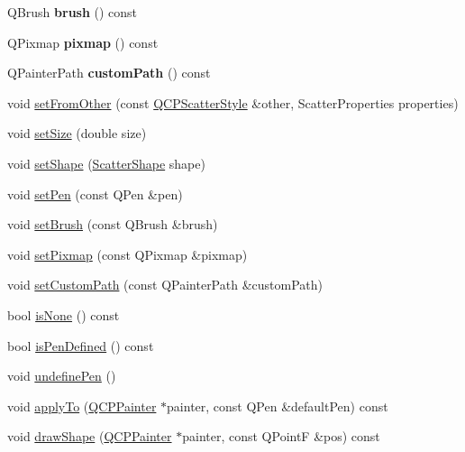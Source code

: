 \begin{DoxyCompactItemize}
Q\+Brush {\bfseries brush} () const
\item 
\mbox{\label{class_q_c_p_scatter_style_a9b2d1a2ec0aac0c74f7582d14050e93a}} 
Q\+Pixmap {\bfseries pixmap} () const
\item 
\mbox{\label{class_q_c_p_scatter_style_aef1fac84c9830fd97f2a8568e605e372}} 
Q\+Painter\+Path {\bfseries custom\+Path} () const
\item 
void \hyperlink{class_q_c_p_scatter_style_a7d59ba8864914f765817841089e436f1}{set\+From\+Other} (const \hyperlink{class_q_c_p_scatter_style}{Q\+C\+P\+Scatter\+Style} \&other, Scatter\+Properties properties)
\item 
void \hyperlink{class_q_c_p_scatter_style_aaefdd031052892c4136129db68596e0f}{set\+Size} (double size)
\item 
void \hyperlink{class_q_c_p_scatter_style_a7c641c4d4c6d29cb705d3887cfce91c1}{set\+Shape} (\hyperlink{class_q_c_p_scatter_style_adb31525af6b680e6f1b7472e43859349}{Scatter\+Shape} shape)
\item 
void \hyperlink{class_q_c_p_scatter_style_a761f1f229cc0ca4703e1e2b89f6dd1ba}{set\+Pen} (const Q\+Pen \&pen)
\item 
void \hyperlink{class_q_c_p_scatter_style_a74d692aaeb8d4b36d6f7d510e44264b1}{set\+Brush} (const Q\+Brush \&brush)
\item 
void \hyperlink{class_q_c_p_scatter_style_a5fb611d46acfac520d7b89a1c71d9246}{set\+Pixmap} (const Q\+Pixmap \&pixmap)
\item 
void \hyperlink{class_q_c_p_scatter_style_a96a3e949f90b2afe5677ca9412a12a1e}{set\+Custom\+Path} (const Q\+Painter\+Path \&custom\+Path)
\item 
bool \hyperlink{class_q_c_p_scatter_style_a72db6bcb1e1abd6e53c1315dd3dea7e4}{is\+None} () const
\item 
bool \hyperlink{class_q_c_p_scatter_style_a47077eb6450fe9a788f833e4ec1b1d5a}{is\+Pen\+Defined} () const
\item 
void \hyperlink{class_q_c_p_scatter_style_acabc2a8c83d650b946f50c3166b6c35e}{undefine\+Pen} ()
\item 
void \hyperlink{class_q_c_p_scatter_style_afd8044ece445300499ca0dc164821e0f}{apply\+To} (\hyperlink{class_q_c_p_painter}{Q\+C\+P\+Painter} $\ast$painter, const Q\+Pen \&default\+Pen) const
\item 
void \hyperlink{class_q_c_p_scatter_style_a89b5105e6027bfcbfeefed9d201b607c}{draw\+Shape} (\hyperlink{class_q_c_p_painter}{Q\+C\+P\+Painter} $\ast$painter, const Q\+PointF \&pos) const

\end{DoxyCompactItemize}
